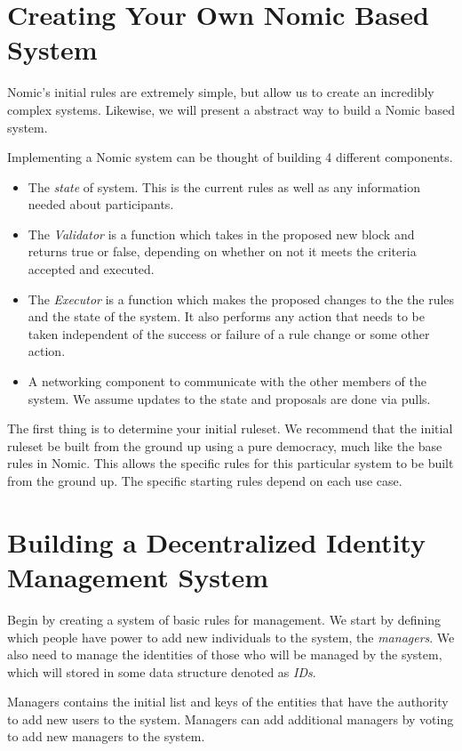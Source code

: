 \documentclass[11pt,letterpaper]{article}
\begin{document}
	\section{Creating Your Own Nomic Based System}
	
	
	Nomic's initial rules are extremely simple, but allow us to create an incredibly complex systems.
	Likewise, we will present a abstract way to build a Nomic based system.
	
	Implementing a Nomic system can be thought of building 4 different components.
	\begin{itemize}
		\item The \textit{state} of system.  This is the current rules as well as any information needed about participants.
		\item The \textit{Validator}  is  a function which takes in the proposed new block and  returns true or false, depending on whether on not it meets the criteria accepted and executed.
		\item The \textit{Executor} is a function which makes the proposed changes to the the rules and the state of the system.  It also performs any action that needs to be taken independent of the success or failure of a rule change or some other action.
		\item A networking component to communicate with the other members of the system.  We assume updates to the state and proposals are done via pulls.
	\end{itemize}
	
	The first thing is to determine your initial ruleset.
	We recommend that the initial ruleset be built from the ground up using a pure democracy, much like the base rules in Nomic.
	This allows the specific rules for this particular system to be built from the ground up.
	The specific starting rules depend on each use case.
	
	
	\section{Building a Decentralized Identity Management System}
	
	Begin by creating a system of basic rules for management.
	We start by defining which people have power to add new individuals to the system, the \textit{managers}.
	We also need to manage the identities of those who will be managed by the system, which will stored in some data structure denoted as \textit{IDs}.
	
	
	Managers contains the initial list and keys of the entities that have the authority to add new users to the system.
	Managers can add additional managers by voting to add new managers to the system.
	
\end{document}
